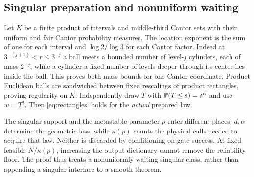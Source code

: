 \subsection{Singular preparation and nonuniform waiting}
Let $K$ be a finite product of intervals and middle-third Cantor sets with their uniform and fair Cantor probability measures. The location exponent is the sum of one for each interval and $\log2/\log3$ for each Cantor factor. Indeed at $3^{-(j+1)}<r\le3^{-j}$ a ball meets a bounded number of level-$j$ cylinders, each of mass $2^{-j}$, while a cylinder a fixed number of levels deeper through its center lies inside the ball. This proves both mass bounds for one Cantor coordinate. Product Euclidean balls are sandwiched between fixed rescalings of product rectangles, proving regularity on $K$. Independently draw $T$ with $\mathbb P(T\le s)=s^\alpha$ and use $w=T^2$. Then \eqref{eq:rectangles} holds for the \emph{actual} prepared law.

The singular support and the metastable parameter $p$ enter different places: $d,\alpha$ determine the geometric loss, while $\kappa(p)$ counts the physical calls needed to acquire that law. Neither is discarded by conditioning on gate success. At fixed feasible $N/\kappa(p)$, increasing the output dictionary cannot remove the reliability floor. The proof thus treats a nonuniformly waiting singular class, rather than appending a singular interface to a smooth theorem.
